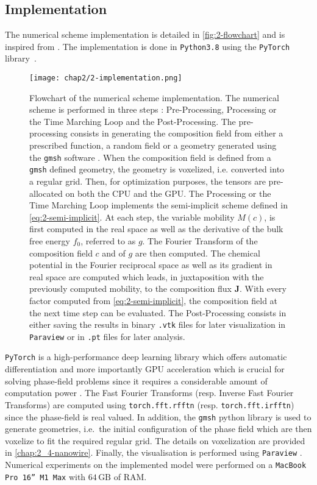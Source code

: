     \subsection{Implementation}
    The numerical scheme implementation is detailed in \autoref{fig:2-flowchart} and is inspired from \cite{Roy2021}. The implementation is done in \texttt{Python3.8} using the \texttt{PyTorch} library\ \cite{Ansel2024}.
    \begin{figure}
        \centering
        \texttt{[image: chap2/2-implementation.png]}
        \caption{Flowchart of the numerical scheme implementation. The numerical scheme is performed in three steps : Pre-Processing, Processing or the Time Marching Loop and the Post-Processing. The pre-processing consists in generating the composition field from either a prescribed function, a random field or a geometry generated using the \texttt{gmsh} software \cite{GeuzaineRemacle}. When the composition field is defined from a \texttt{gmsh} defined geometry, the geometry is voxelized, i.e. converted into a regular grid. Then, for optimization purposes, the tensors are pre-allocated on both the CPU and the GPU. The Processing or the Time Marching Loop implements the semi-implicit scheme defined in \autoref{eq:2-semi-implicit}. At each step, the variable mobility $M(c)$, is first computed in the real space as well as the derivative of the bulk free energy $f_0$, referred to as $g$. The Fourier Transform of the composition field $c$ and of $g$ are then computed. The chemical potential in the Fourier reciprocal space as well as its gradient in real space are computed which leads, in juxtaposition with the previously computed mobility, to the composition flux $\mathbf{J}$. With every factor computed from \autoref{eq:2-semi-implicit}, the composition field at the next time step can be evaluated. The Post-Processing consists in either saving the results in binary \texttt{.vtk} files for later visualization in \texttt{Paraview} \cite{Ayachit2015} or in \texttt{.pt} files for later analysis.}
        \label{fig:2-flowchart}
    \end{figure}
    \texttt{PyTorch} is a high-performance deep learning library which offers automatic differentiation and more importantly GPU acceleration which is crucial for solving phase-field problems since it requires a considerable amount of computation power \cite{2024-6}. The Fast Fourier Transforms (resp. Inverse Fast Fourier Transforms) are computed using \texttt{torch.fft.rfftn} (resp. \texttt{torch.fft.irfftn}) since the phase-field is real valued. In addition, the \texttt{gmsh} python library is used to generate geometries, i.e.\ the initial configuration of the phase field which are then voxelize to fit the required regular grid. The details on voxelization are provided in \autoref{chap:2_4-nanowire}. Finally, the visualisation is performed using \texttt{Paraview} \cite{Ayachit2015}.\\
    Numerical experiments on the implemented model were performed on a \texttt{MacBook Pro 16'' M1 Max} with $64\,\text{GB}$ of RAM.
